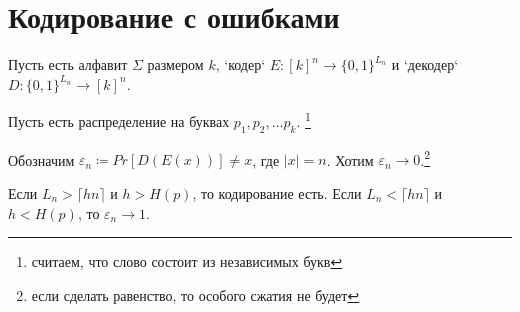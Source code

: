 \section{Кодирование с ошибками}
Пусть есть алфавит $ \Sigma$ размером  $ k$, `кодер`  $ E \colon [k]^{n} \to  \{0, 1\}^{L_n}$ и `декодер` $ D\colon \{0, 1\}^{L_n} \to [k]^{n}$.

Пусть есть распределение на буквах $  p_1, p_2, \ldots p_k$. \footnote{считаем, что слово состоит из независимых букв}

Обозначим $ \varepsilon _n \coloneqq Pr [D(E(x))] \ne x$, где $\lvert x  \rvert = n$. Хотим $ \varepsilon _n \to  0$.\footnote{если сделать равенство, то особого сжатия не будет}

\begin{thm}
	Если $ L_n > \lceil h n \rceil $ и  $ h > H(p)$, то кодирование есть. Если  $ L_n < \lceil hn \rceil$ и $ h < H(p)$, то  $ \varepsilon _n \to 1$.
\end{thm}
